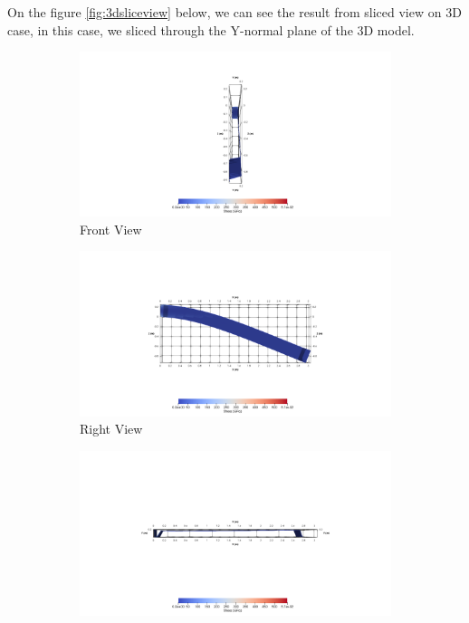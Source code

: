 \documentclass[a4paper,11pt]{article}
\begin{document}
\newline
On the figure \ref{fig:3dsliceview} below, we can see the result from sliced view on 3D case, in this case, we sliced through the Y-normal plane of the 3D model.
\begin{figure}[h!]
	\begin{subfigure}[b]{0.5\linewidth}
		\centering
		\includegraphics[width=\linewidth]{picture/conference/3dslice4}
		\caption{Front View}
	\end{subfigure}
	\quad
	\begin{subfigure}[b]{0.5\linewidth}
		\centering
		\includegraphics[width=\linewidth]{picture/conference/3dslice6}
		\caption{Right View}
	\end{subfigure}
	\quad
	\begin{subfigure}[b]{0.5\linewidth}
		\centering
		\includegraphics[width=\linewidth]{picture/conference/3dslice8}

\end{subfigure}
\end{figure}
\end{document}
